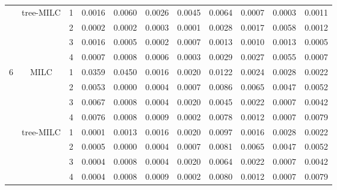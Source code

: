 \documentclass[a4paper, 11pt]{article} %
\begin{document}
\begin{table}[ht]
\begin{tabular}{cc r llll  rrrr }
   & \multirow{4}{*}{tree-MILC}
   &1
 & 0.0016 & 0.0060 & 0.0026 & 0.0045
& 0.0064 & 0.0007 & 0.0003 & 0.0011 \\ 
  &&2
& 0.0002 & 0.0002 & 0.0003 & 0.0001 
& 0.0028 & 0.0017 & 0.0058 & 0.0012 \\ 
  &&3 
& 0.0016 & 0.0005 & 0.0002 & 0.0007
  & 0.0013 & 0.0010 & 0.0013 & 0.0005 \\ 
  &&4 
& 0.0007 & 0.0008 & 0.0006 & 0.0003
  & 0.0029 & 0.0027 & 0.0055 & 0.0007 \\ 
    \hline
    \hline
  \multirow{8}{*}{6}
   & \multirow{4}{*}{MILC}
&  1
& 0.0359 & 0.0450 & 0.0016 & 0.0020 
& 0.0122 & 0.0024 & 0.0028 & 0.0022 \\  
 && 2 
& 0.0053 & 0.0000 & 0.0004 & 0.0007
& 0.0086 & 0.0065 & 0.0047 & 0.0052 \\ 
  &&3
  & 0.0067 & 0.0008 & 0.0004 & 0.0020 
  & 0.0045 & 0.0022 & 0.0007 & 0.0042 \\  
  &&4
  & 0.0076 & 0.0008 & 0.0009 & 0.0002
 & 0.0078 & 0.0012 & 0.0007 & 0.0079 \\
  \cline{2-11}
   & \multirow{4}{*}{tree-MILC}
   &1
& 0.0001 & 0.0013 & 0.0016 & 0.0020
& 0.0097 & 0.0016 & 0.0028 & 0.0022 \\ 
  &&2
& 0.0005 & 0.0000 & 0.0004 & 0.0007
 & 0.0081 & 0.0065 & 0.0047 & 0.0052 \\  
  &&3 
& 0.0004 & 0.0008 & 0.0004 & 0.0020 
 & 0.0064 & 0.0022 & 0.0007 & 0.0042 \\  
  &&4 
& 0.0004 & 0.0008 & 0.0009 & 0.0002 
 & 0.0080 & 0.0012 & 0.0007 & 0.0079 \\ 


\end{tabular}
\end{table}
\end{document}

